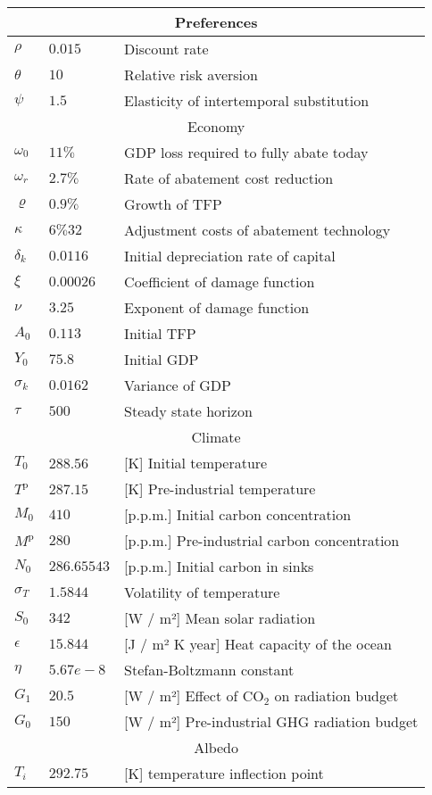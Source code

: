 \documentclass[../../main.tex]{subfiles}
\begin{document}
\begin{tabular}{ |p{1cm}||p{3cm}|p{8cm}|  }
    \hline
    \multicolumn{3}{|c|}{Preferences} \\
    \hline
    $\rho$ & $0.015$ & Discount rate \\
    $\theta$ & $10$ & Relative risk aversion \\
    $\psi$ & $1.5$ & Elasticity of intertemporal substitution \\
    \hline\hline
    \multicolumn{3}{|c|}{Economy} \\
    \hline
    $\omega_0$ & $11 \%$ & GDP loss required to fully abate today\\
    $\omega_r$ & $2.7 \%$ & Rate of abatement cost reduction \\
    $\varrho$ & $0.9 \%$ & Growth of TFP \\
    $\kappa$ & $6\%32$ & Adjustment costs of abatement technology \\
    $\delta_k$ & $0.0116$ & Initial depreciation rate of capital \\
    $\xi$ & $0.00026$ & Coefficient of damage function \\
    $\nu$ & $3.25$ & Exponent of damage function \\
    $A_0$ & $0.113$ & Initial TFP \\
    $Y_0$ & $75.8$ & Initial GDP \\
    $\sigma_k$ & $0.0162$ & Variance of GDP \\
    $\tau$ & $500$ & Steady state horizon  \\
    \hline
    \hline 
    \multicolumn{3}{|c|}{Climate} \\
    \hline
    $T_0$ & 288.$56$ & [K] Initial temperature \\
    $T^{\mathrm{p}}$ & 287.$15$ & [K] Pre-industrial temperature \\
    $M_0$ & $410$ & [p.p.m.] Initial carbon concentration \\
    $M^{\mathrm{p}}$ & $280$ & [p.p.m.] Pre-industrial carbon concentration \\
    $N_0$ & $286.65543$ & [p.p.m.] Initial carbon in sinks \\
    $\sigma_T$ & $1.5844$ & Volatility of temperature \\
    $S_0$ & $342$ & [W / m²] Mean solar radiation \\
    $\epsilon$ & $15.844$ & [J / m² K year] Heat capacity of the ocean \\
    $\eta$ & $5.67e-8$ & Stefan-Boltzmann constant  \\
    $G_1$ & $20.5$ & [W / m²] Effect of CO$_2$ on radiation budget \\
    $G_0$ & $150$ & [W / m²] Pre-industrial GHG radiation budget \\
    \hline\hline
    \multicolumn{3}{|c|}{Albedo} \\
    \hline 
    $T_i$ & $292.75$ & [K] temperature inflection point \\
    \hline
\end{tabular}
\end{document}
